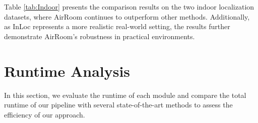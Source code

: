 Table \ref{tab:Indoor} presents the comparison results on the two indoor localization datasets, where AirRoom continues to outperform other methods. Additionally, as InLoc represents a more realistic real-world setting, the results further demonstrate AirRoom's robustness in practical environments.

\begin{table}[h]
\vspace{-7pt}
\centering
{}
\caption{Comparison with baseline models on existing datasets to further validate our method.}
\label{tab:Indoor}
\end{table}

\section{Runtime Analysis}

In this section, we evaluate the runtime of each module and compare the total runtime of our pipeline with several state-of-the-art methods to assess the efficiency of our approach.

